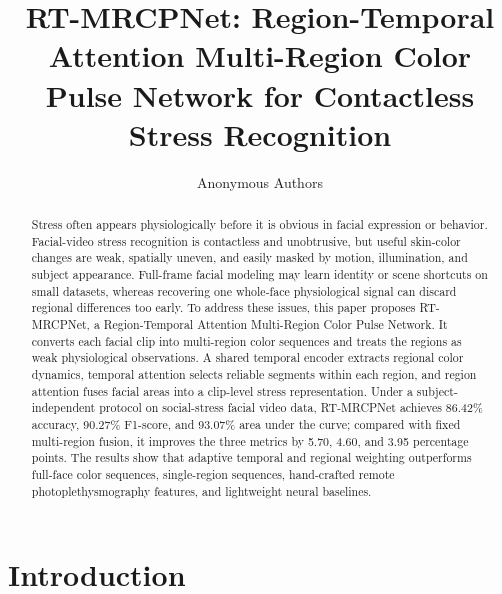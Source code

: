 \documentclass[runningheads]{llncs}
\begin{document}
\title{RT-MRCPNet: Region-Temporal Attention Multi-Region Color Pulse Network for Contactless Stress Recognition}

\author{Anonymous Authors}

\maketitle

\begin{abstract}
Stress often appears physiologically before it is obvious in facial expression or behavior. Facial-video stress recognition is contactless and unobtrusive, but useful skin-color changes are weak, spatially uneven, and easily masked by motion, illumination, and subject appearance. Full-frame facial modeling may learn identity or scene shortcuts on small datasets, whereas recovering one whole-face physiological signal can discard regional differences too early. To address these issues, this paper proposes RT-MRCPNet, a Region-Temporal Attention Multi-Region Color Pulse Network. It converts each facial clip into multi-region color sequences and treats the regions as weak physiological observations. A shared temporal encoder extracts regional color dynamics, temporal attention selects reliable segments within each region, and region attention fuses facial areas into a clip-level stress representation. Under a subject-independent protocol on social-stress facial video data, RT-MRCPNet achieves 86.42\% accuracy, 90.27\% F1-score, and 93.07\% area under the curve; compared with fixed multi-region fusion, it improves the three metrics by 5.70, 4.60, and 3.95 percentage points. The results show that adaptive temporal and regional weighting outperforms full-face color sequences, single-region sequences, hand-crafted remote photoplethysmography features, and lightweight neural baselines.

\end{abstract}

\section{Introduction}
\end{document}
